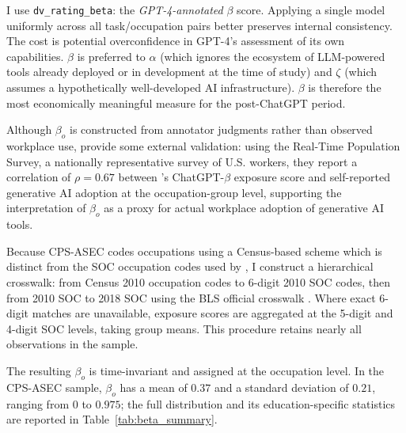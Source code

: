 \documentclass[11pt]{article}
\theoremstyle{plain}
\theoremstyle{remark}
\begin{document}
I use \texttt{dv\_rating\_beta}: the \textit{GPT-4-annotated} $\beta$ score. Applying a single model uniformly across all task/occupation pairs better preserves internal consistency. The cost is potential overconfidence in GPT-4's assessment of its own capabilities. $\beta$ is preferred to $\alpha$ (which ignores the ecosystem of LLM-powered tools already deployed or in development at the time of study) and $\zeta$ (which assumes a hypothetically well-developed AI infrastructure). $\beta$ is therefore the most economically meaningful measure for the post-ChatGPT period.  

Although $\beta_o$ is constructed from annotator judgments rather than observed workplace use, \textcite{bick2024rapid} provide some external validation: using the Real-Time Population Survey, a nationally representative survey of U.S. workers, they report a correlation of $\rho = 0.67$ between \textcite{eloundou2024gpts}'s ChatGPT-$\beta$ exposure score and self-reported generative AI adoption at the occupation-group level, supporting the interpretation of $\beta_o$ as a proxy for actual workplace adoption of generative AI tools.


Because CPS-ASEC codes occupations using a Census-based scheme which is distinct from the SOC occupation codes used by \textcite{eloundou2024gpts}, I construct a hierarchical crosswalk: from Census 2010 occupation codes to 6-digit 2010 SOC codes, then from 2010 SOC to 2018 SOC using the BLS official crosswalk \parencite{bls_soc_crosswalk_2018}. Where exact 6-digit matches are unavailable, exposure scores are aggregated at the 5-digit and 4-digit SOC levels, taking group means. This procedure retains nearly all observations in the sample.

The resulting $\beta_o$ is time-invariant and assigned at the occupation level.  In the CPS-ASEC sample, $\beta_o$ has a mean of $0.37$ and a standard deviation of $0.21$, ranging from $0$ to $0.975$; the full distribution and its education-specific statistics are reported in Table~\ref{tab:beta_summary}.

\begin{table}[htbp]
\begin{center}
\caption{Summary statistics for the AI exposure score $\beta_o$ in the CPS-ASEC worker-year sample, 2018--2025. Statistics are reported for the full sample and separately for college-educated (BA or above) and non-college (high school or some college) workers.}
\label{tab:beta_summary}

\end{center}
\end{table}
\end{document}
